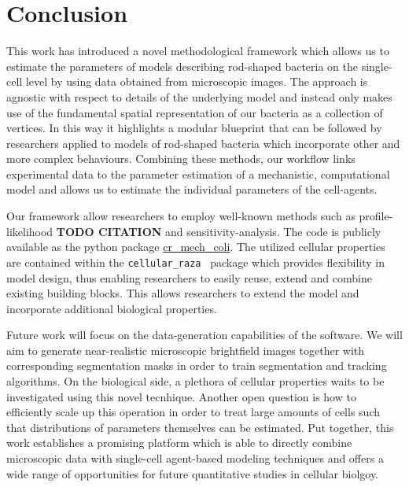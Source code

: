 \documentclass{article}
\begin{document}
\section{Conclusion}

This work has introduced a novel methodological framework which allows us to estimate the parameters
of models describing rod-shaped bacteria on the single-cell level by using data obtained from
microscopic images.
The approach is agnostic with respect to details of the underlying model and instead only makes use
of the fundamental spatial representation of our bacteria as a collection of vertices.
In this way it highlights a modular blueprint that can be followed by researchers applied to models
of rod-shaped bacteria which incorporate other and more complex behaviours.
Combining these methods, our workflow links experimental data to the parameter estimation of a
mechanistic, computational model and allows us to estimate the individual parameters of the
cell-agents.

Our framework allow researchers to employ well-known methods such as profile-likelihood
\textbf{TODO CITATION} and sensitivity-analysis.
The code is publicly available as the python package
\href{https://github.com/jonaspleyer/cr_mech_coli}{cr\_mech\_coli}.
The utilized cellular properties are contained within the \texttt{cellular\_raza}~\cite{Pleyer2025}
package which provides flexibility in model design, thus enabling researchers to easily reuse,
extend and combine existing building blocks.
This allows researchers to extend the model and incorporate additional biological properties.

Future work will focus on the data-generation capabilities of the software.
We will aim to generate near-realistic microscopic brightfield images together with corresponding
segmentation masks in order to train segmentation and tracking algorithms.
On the biological side, a plethora of cellular properties waits to be investigated using this novel
tecnhique.
Another open question is how to efficiently scale up this operation in order to treat large amounts
of cells such that distributions of parameters themselves can be estimated.
Put together, this work establishes a promising platform which is able to directly combine
microscopic data with single-cell agent-based modeling techniques and offers a wide range of
opportunities for future quantitative studies in cellular biolgoy.
\end{document}
